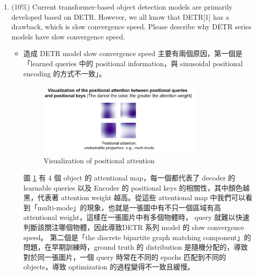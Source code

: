 \documentclass[10pt,a4paper]{article}
\begin{document}
\begin{enumerate}
\item (10\%) Current transformer-based object detection models are primarily developed based on DETR. However, we all know that DETR[1] has a drawback, which is slow convergence speed. Please describe why DETR series models have slow convergence speed.
\begin{itemize}
\item 造成 DETR model slow convergence speed 主要有兩個原因，第一個是「learned queries 中的 positional information，與 sinusoidal positional encoding 的方式不一致」。
\begin{figure}[hbt]
\centering
\includegraphics[width=0.8\textwidth]{DETR_slowconverge.png}
\caption{Visualization of positional attention}
\label{fig:slowConvergenceDETR}
\end{figure}
圖 \ref{fig:slowConvergenceDETR} 有 4 個 object 的 attentional map，每一個都代表了 decoder 的 learnable queries 以及 Encoder 的 positional keys 的相關性，其中顏色越黑，代表著 attention weight 越高。從這些 attentional map 中我們可以看到「multi-mode」的現象，也就是一張圖中有不只一個區域有高 attentional weight，這樣在一張圖片中有多個物體時， query 就難以快速判斷該關注哪個物體，因此導致DETR 系列 model 的 slow convergence speed。
第二個是「the discrete bipartite graph matching component」的問題，在早期訓練時，ground truth 的 distribution 是隨機分配的，導致對於同一張圖片，一個 query 時常在不同的 epochs 匹配到不同的 objects，導致 optimization 的過程變得不一致且緩慢。
\end{itemize}



\end{enumerate}
\end{document}
